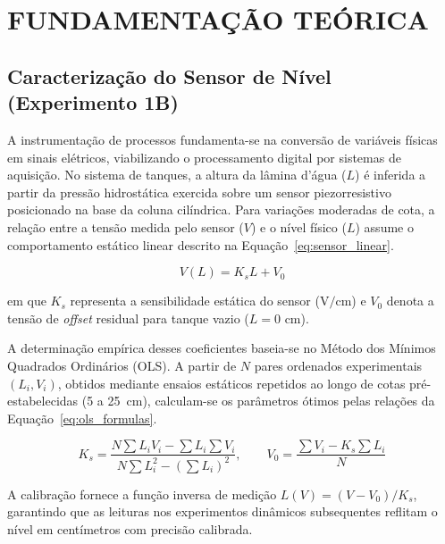 \documentclass[a4paper,12pt]{article}
\begin{document}
\newpage

\section{FUNDAMENTAÇÃO TEÓRICA}

\subsection{Caracterização do Sensor de Nível (Experimento 1B)}

\begin{justify}
    \hspace{4ex}A instrumentação de processos fundamenta-se na conversão de variáveis físicas em sinais elétricos, viabilizando o processamento digital por sistemas de aquisição. No sistema de tanques, a altura da lâmina d'água ($L$) é inferida a partir da pressão hidrostática exercida sobre um sensor piezorresistivo posicionado na base da coluna cilíndrica. Para variações moderadas de cota, a relação entre a tensão medida pelo sensor ($V$) e o nível físico ($L$) assume o comportamento estático linear descrito na Equação~\eqref{eq:sensor_linear}.
\end{justify}

\begin{equation}
    V(L) = K_s L + V_0
    \label{eq:sensor_linear}
\end{equation}

\noindent em que $K_s$ representa a sensibilidade estática do sensor ($\text{V/cm}$) e $V_0$ denota a tensão de \textit{offset} residual para tanque vazio ($L = 0\text{ cm}$).

\begin{justify}
    \hspace{4ex}A determinação empírica desses coeficientes baseia-se no Método dos Mínimos Quadrados Ordinários (OLS). A partir de $N$ pares ordenados experimentais $(L_i, V_i)$, obtidos mediante ensaios estáticos repetidos ao longo de cotas pré-estabelecidas (5 a 25~cm), calculam-se os parâmetros ótimos pelas relações da Equação~\eqref{eq:ols_formulas}.
\end{justify}

\begin{equation}
    K_s = \frac{N \sum L_i V_i - \sum L_i \sum V_i}{N \sum L_i^2 - \left(\sum L_i\right)^2}, \qquad
    V_0 = \frac{\sum V_i - K_s \sum L_i}{N}
    \label{eq:ols_formulas}
\end{equation}

\noindent A calibração fornece a função inversa de medição $L(V) = (V - V_0)/K_s$, garantindo que as leituras nos experimentos dinâmicos subsequentes reflitam o nível em centímetros com precisão calibrada.
\end{document}
